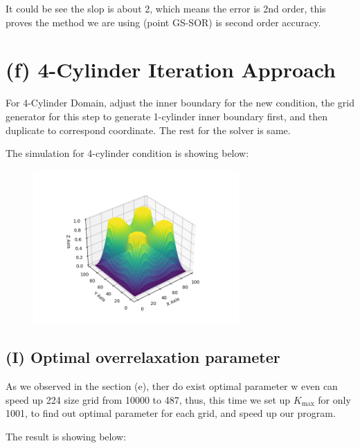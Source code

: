 \documentclass[12pt]{article}
\begin{document}
It could be see the slop is about 2, which means the error is 2nd order, this proves 
the method we are using (point GS-SOR) is second order accuracy.


\section{(f) 4-Cylinder Iteration Approach}

For 4-Cylinder Domain, adjust the inner boundary for the new condition, the grid 
generator for this step to generate 1-cylinder inner boundary first, and then 
duplicate to correspond coordinate. The rest for the solver is same.

The simulation for 4-cylinder condition is showing below:


\begin{figure}[H]
    \centering
    \includegraphics[width=0.7\textwidth]{4cylinder_simple_show.png}
    \label{4cylinder_simple_show.png}
\end{figure}


\subsection{(I) Optimal overrelaxation parameter}

As we observed in the section (e), ther do exist optimal parameter w even can 
speed up 224 size grid from 10000 to 487, thus, this time we set up \( K_{\text{max}} \)
for only 1001, to find out optimal parameter for each grid, and speed up our program.

The result is showing below:
\end{document}
